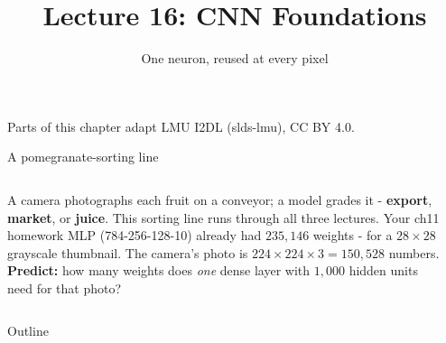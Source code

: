 \documentclass[aspectratio=169]{beamer}
\title{Lecture 16: CNN Foundations}
\subtitle{One neuron, reused at every pixel}
\date{}
\begin{document}
\begin{frame}
  \titlepage
  \begin{center}\scriptsize\color{gray}
    Parts of this chapter adapt LMU I2DL (slds-lmu), CC BY 4.0.
  \end{center}
\end{frame}

\begin{frame}{A pomegranate-sorting line}
  \begin{columns}[T]
    A camera photographs each fruit on a conveyor; a model grades it - \textbf{export},
    \textbf{market}, or \textbf{juice}. This sorting line runs through all three lectures.
    \vskip 6pt
    Your ch11 homework MLP (784-256-128-10) already had \textbf{$235{,}146$} weights - for
    a $28\times28$ grayscale thumbnail. The camera's photo is
    $224 \times 224 \times 3 = 150{,}528$ numbers.
    \vskip 6pt
    \textbf{Predict:} how many weights does \emph{one} dense layer with $1{,}000$ hidden
    units need for that photo?
    \pause
    \vskip 6pt
    \begin{center}
    \end{center}
  \end{columns}
\end{frame}

\begin{frame}{Outline}
  \tableofcontents
\end{frame}
\end{document}
